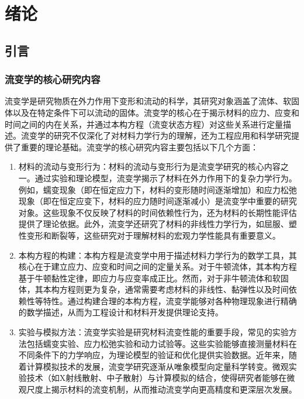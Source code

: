 \chapter{绪论}

\section{引言}
\subsection{流变学的核心研究内容}
流变学是研究物质在外力作用下变形和流动的科学，其研究对象涵盖了流体、软固体以及在特定条件下可以流动的固体\cite{dealyIntroductionRheology1990}。流变学的核心在于揭示材料的应力、应变和时间之间的内在关系，并通过本构方程（流变状态方程）对这些关系进行定量描述。流变学的研究不仅深化了对材料力学行为的理解，还为工程应用和科学研究提供了重要的理论基础。流变学的核心研究内容主要包括以下几个方面\cite{elleroTanner90Years2024}：
\begin{enumerate}[topsep = 0 pt, itemsep= 0 pt, parsep=0pt, partopsep=0pt, leftmargin=44pt, itemindent=0pt, labelsep=6pt, label=(\arabic*)]
	\item 材料的流动与变形行为：材料的流动与变形行为是流变学研究的核心内容之一。通过实验和理论模型，流变学揭示了材料在外力作用下的复杂力学行为。例如，蠕变现象（即在恒定应力下，材料的变形随时间逐渐增加）和应力松弛现象（即在恒定应变下，材料的应力随时间逐渐减小）是流变学中重要的研究对象。这些现象不仅反映了材料的时间依赖性行为，还为材料的长期性能评估提供了理论依据。此外，流变学还研究了材料的非线性力学行为，如屈服、塑性变形和断裂等，这些研究对于理解材料的宏观力学性能具有重要意义。
	\item	  本构方程的构建：本构方程是流变学中用于描述材料力学行为的数学工具，其核心在于建立应力、应变和时间之间的定量关系。对于牛顿流体，其本构方程基于牛顿黏性定律，即应力与应变率成正比。然而，对于非牛顿流体和软固体，其本构方程则更为复杂，通常需要考虑材料的非线性、黏弹性以及时间依赖性等特性。通过构建合理的本构方程，流变学能够对各种物理现象进行精确的数学描述，从而为工程设计和材料开发提供理论支持。
	\item  实验与模拟方法：流变学实验是研究材料流变性能的重要手段，常见的实验方法包括蠕变实验、应力松弛实验和动力试验等。这些实验能够直接测量材料在不同条件下的力学响应，为理论模型的验证和优化提供实验数据。近年来，随着计算模拟技术的发展，流变学研究逐渐从唯象模型向定量科学转变。微观实验技术（如X射线散射、中子散射）与计算模拟的结合，使得研究者能够在微观尺度上揭示材料的流变机制，从而推动流变学向更高精度和更深层次发展。
\end{enumerate}
